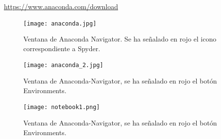 \begin{center}
    \hyperlink{https://www.anaconda.com/download}{https://www.anaconda.com/download}
\end{center}

\begin{figure}[h]
    \centering
    \texttt{[image: anaconda.jpg]}
    \caption{Ventana de Anaconda Navigator. Se ha señalado en rojo el icono correspondiente a Spyder.}
    \label{fig:anaconda}
\end{figure} 
\begin{figure}
    \centering
    \texttt{[image: anaconda\_2.jpg]}
    \caption{Ventana de Anaconda-Navigator, se ha señalado en rojo el botón Environments.}
    \label{fig:anaconda2}
\end{figure}

\begin{figure}
\centering
    \texttt{[image: notebook1.png]}
    \caption{Ventana de Anaconda-Navigator, se ha señalado en rojo el botón Environments.}
    \label{fig:ntb1}
\end{figure}
